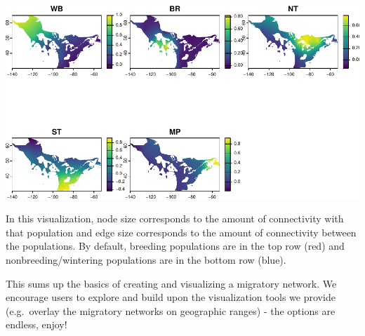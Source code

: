 \documentclass[
]{book}
\newenvironment{Shaded}{\begin{snugshade}}{\end{snugshade}}
\newcommand{\AttributeTok}[1]{\textcolor[rgb]{0.77,0.63,0.00}{#1}}
\newcommand{\CommentTok}[1]{\textcolor[rgb]{0.56,0.35,0.01}{\textit{#1}}}
\newcommand{\DecValTok}[1]{\textcolor[rgb]{0.00,0.00,0.81}{#1}}
\newcommand{\FloatTok}[1]{\textcolor[rgb]{0.00,0.00,0.81}{#1}}
\newcommand{\FunctionTok}[1]{\textcolor[rgb]{0.00,0.00,0.00}{#1}}
\newcommand{\NormalTok}[1]{#1}
\newcommand{\OtherTok}[1]{\textcolor[rgb]{0.56,0.35,0.01}{#1}}
\newcommand{\SpecialCharTok}[1]{\textcolor[rgb]{0.00,0.00,0.00}{#1}}
\newcommand{\StringTok}[1]{\textcolor[rgb]{0.31,0.60,0.02}{#1}}
\begin{document}
\begin{Shaded}
\end{Shaded}

\includegraphics{Mignette_files/figure-latex/unnamed-chunk-15-1.pdf}

In this visualization, node size corresponds to the amount of connectivity with that population and edge size corresponds to the amount of connectivity between the populations. By default, breeding populations are in the top row (red) and nonbreeding/wintering populations are in the bottom row (blue).

This sums up the basics of creating and visualizing a migratory network. We encourage users to explore and build upon the visualization tools we provide (e.g.~overlay the migratory networks on geographic ranges) - the options are endless, enjoy!

  
\end{document}
